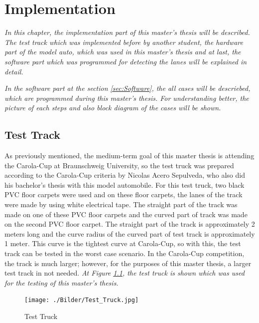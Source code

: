 %
\chapter{Implementation}\label{cha:Implementation}
%
\emph{\color{blue}In this chapter, the implementation part of this master's thesis will be described. The test track which was implemented before by another student, the hardware part of the model auto, which was used in this master's thesis and at last, the software part which was programmed for detecting the lanes will be explained in detail.}

\emph{\color{blue}In the software part at the section \ref{sec:Software}, the all cases will be descriebed, which are programmed during this master's thesis. For understanding better, the picture of each steps and also block diagram of the cases will be shown.}

%
\section{Test Track}\label{sec:Test Track}

As previously mentioned, the medium-term goal of this master thesis is attending the Carola-Cup at Braunschweig University, so the test truck was prepared according to the Carola-Cup criteria by Nicolas Acero Sepulveda, who also did his bachelor's thesis with this model automobile. For this test truck, two black PVC floor carpets were used and on these floor carpets, the lanes of the track were made by using white electrical tape. The straight part of the track was made on one of these PVC floor carpets and the curved part of track was made on the second PVC floor carpet. The straight part of the track is approximately 2 meters long and the curve radius of the curved part of test track is approximately 1 meter. This curve is the tightest curve at Carola-Cup, so with this, the test track can be tested in the worst case scenario. In the Carola-Cup competition, the track is much larger; however, for the purposes of this master thesis, a larger test track in not needed. \emph{\color{blue}At Figure \ref{fig:Test_Truck}, the test truck is shown which was used for the testing of this master's thesis.}


\begin{figure}[H]
	\centering
		\texttt{[image: ./Bilder/Test\_Truck.jpg]}
	\caption{Test Truck}
	\label{fig:Test_Truck}
\end{figure}



